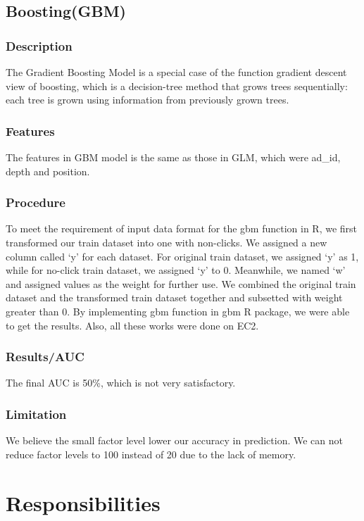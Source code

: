 \documentclass[12pt]{article}
\begin{document}
\subsection{Boosting(GBM)}
\subsubsection{Description}
The Gradient Boosting Model is a special case of the function gradient descent view of boosting, which is a decision-tree method that grows trees sequentially: each tree is grown using information from previously grown trees.
\subsubsection{Features}
The features in GBM model is the same as those in GLM, which were ad\_id, depth and position.
\subsubsection{Procedure}
To meet the requirement of input data format for the gbm function in R, we first transformed our train dataset into one with non-clicks. We assigned a new column called ‘y’ for each dataset. For original train dataset, we assigned ‘y’ as 1, while for no-click train dataset, we assigned ‘y’ to 0. Meanwhile, we named ‘w’ and assigned values as the weight for further use. We combined the original train dataset and the transformed train dataset together and subsetted with weight greater than 0. By implementing gbm function in gbm R package, we were able to get the results. Also, all these works were done on EC2.  
\subsubsection{Results/AUC}
The final AUC is 50\%, which is not very satisfactory. 


\subsubsection{Limitation}
We believe the small factor level lower our accuracy in prediction. We can not reduce factor levels to 100 instead of 20 due to the lack of memory.








\section{Responsibilities}
\end{document}

